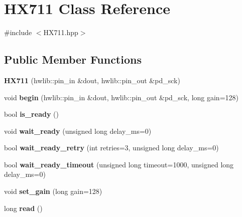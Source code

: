 \hypertarget{classHX711}{}\section{H\+X711 Class Reference}
\label{classHX711}


{\ttfamily \#include $<$H\+X711.\+hpp$>$}

\subsection*{Public Member Functions}
\begin{DoxyCompactItemize}
\item 
\mbox{\label{classHX711_a16777f55c74074686751ccf4934ccb6c}} 
{\bfseries H\+X711} (hwlib\+::pin\+\_\+in \&dout, hwlib\+::pin\+\_\+out \&pd\+\_\+sck)
\item 
\mbox{\label{classHX711_a98014724b341fd11d4637b8ee6633344}} 
void {\bfseries begin} (hwlib\+::pin\+\_\+in \&dout, hwlib\+::pin\+\_\+out \&pd\+\_\+sck, long gain=128)
\item 
\mbox{\label{classHX711_aab3f9242a603af7dfe396584d0e4cb3b}} 
bool {\bfseries is\+\_\+ready} ()
\item 
\mbox{\label{classHX711_a50ee49eb42a2a5f2aca38a2dd895396e}} 
void {\bfseries wait\+\_\+ready} (unsigned long delay\+\_\+ms=0)
\item 
\mbox{\label{classHX711_a23acee27a0d14f458a33074e8b3e6ac3}} 
bool {\bfseries wait\+\_\+ready\+\_\+retry} (int retries=3, unsigned long delay\+\_\+ms=0)
\item 
\mbox{\label{classHX711_adc3177912a0c1cd0215c4bab5c97876b}} 
bool {\bfseries wait\+\_\+ready\+\_\+timeout} (unsigned long timeout=1000, unsigned long delay\+\_\+ms=0)
\item 
\mbox{\label{classHX711_a6033250e77b3e96827549384868bee65}} 
void {\bfseries set\+\_\+gain} (long gain=128)
\item 
\mbox{\label{classHX711_a6f62858732ea430a7d61d23cdd5c90d0}} 
long {\bfseries read} ()
\item 
\mbox{\label{classHX711_a7a74353785310e6ee538015859e8909e}} 

\end{DoxyCompactItemize}
